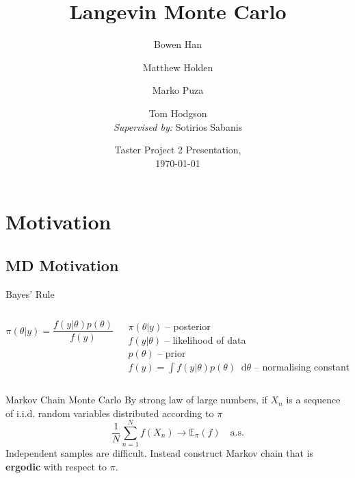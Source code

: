\documentclass[aspectratio=169]{beamer}
\title{Langevin Monte Carlo}
\author{Bowen Han\inst{1} \and Matthew Holden\inst{1} \and Marko Puza\inst{1} \and Tom Hodgson\inst{1} \\ \textit{Supervised by:} Sotirios Sabanis\inst{2}}
\institute[Universities of Somewhere and Elsewhere] %
{
  \inst{1}%
    The Maxwell Institute Graduate School in Analysis \& its Applications
  \and
  \inst{2}%
  University of Edinburgh
}
\date{ Taster Project 2 Presentation,\\ \today}
\newcommand{\dif}{\mathop{}\!\mathrm{d}}
\begin{document}
\begin{frame}
  \titlepage
\end{frame}


\section{Motivation}


\subsection{MD Motivation}



\begin{frame}{Bayes' Rule}
\begin{columns}[T] %
\begin{column}{.48\textwidth}
 \[\pi(\theta|y) = \frac{f(y|\theta)p(\theta)}{f(y)}\]
\end{column}%
\hfill%
\begin{column}{.48\textwidth}
$\pi(\theta|y)$ -- posterior\\ $f(y|\theta)$ -- likelihood of data\\ $p(\theta)$ -- prior\\ $f(y) = \int f(y|\theta)p(\theta) \dif \theta$ -- normalising constant
\end{column}%
\end{columns}
\end{frame}

\begin{frame}{Markov Chain Monte Carlo}
    By strong law of large numbers, if $X_n$ is a sequence of i.i.d. random variables distributed according to $\pi$
    \[\frac{1}{N}\sum_{n=1}^N f(X_n) \to \mathbb{E}_\pi(f) \quad \text{a.s.}\]
    \pause
    Independent samples are difficult.  Instead construct Markov chain that is \textbf{ergodic} with respect to $\pi$.
\end{frame}
\end{document}
